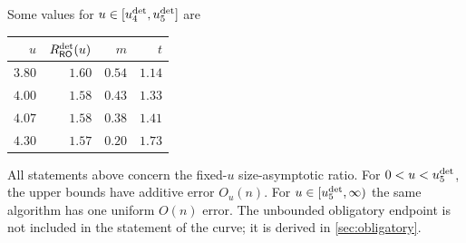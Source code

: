 \begin{remark}
Some values for $u\in[u_{4}^{\mathrm{det}},u_{5}^{\mathrm{det}}]$ are
\begin{center}
\begin{tabular}{@{}rrrr@{}}
\toprule
$u$ & $R_{\mathsf{RO}}^{\mathrm{det}}(u)$ & $m$ & $t$\\
\midrule
$3.80$ & $1.60$ & $0.54$ & $1.14$\\
$4.00$ & $1.58$ & $0.43$ & $1.33$\\
$4.07$ & $1.58$ & $0.38$ & $1.41$\\
$4.30$ & $1.57$ & $0.20$ & $1.73$\\
\bottomrule
\end{tabular}
\end{center}
\end{remark}

\begin{remark}
\label{rem:opt:curve-audit}
All statements above concern the fixed-$u$ size-asymptotic ratio.  For
$0<u<u_{5}^{\mathrm{det}}$, the upper bounds have additive error $O_u(n)$.  For
$u\in[u_{5}^{\mathrm{det}},\infty)$ the same algorithm has one uniform $O(n)$ error.
The unbounded obligatory endpoint is not included in the statement of the
curve; it is derived in \cref{sec:obligatory}.
\end{remark}
